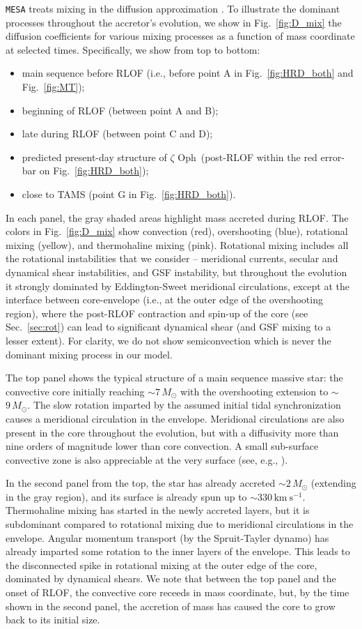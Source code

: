 \documentclass[twocolumn,twocolappendix,trackchanges]{aastex63}
\newcommand{\kms}{{\mathrm{km\ s^{-1}}}}
\DeclareRobustCommand{\Figref}[1]{Fig.~\ref{#1}}
\DeclareRobustCommand{\Secref}[1]{Sec.~\ref{#1}}
\newcommand{\zoph}{$\zeta$ Oph}
\begin{document}
\texttt{MESA} treats mixing in the diffusion approximation
\citep{paxton:11}. To illustrate the dominant processes throughout the
accretor's evolution, we show in \Figref{fig:D_mix} the diffusion
coefficients for various mixing processes as a function of mass
coordinate at selected times. Specifically, we show from top to
bottom:
\begin{itemize}
\item main sequence before RLOF (i.e., before point A in
  \Figref{fig:HRD_both} and \Figref{fig:MT});
\item beginning of RLOF (between point A and B);
\item late during RLOF (between point C and D);
\item predicted present-day structure of \zoph\ (post-RLOF within the
  red error-bar on \Figref{fig:HRD_both});
\item close to TAMS (point G in \Figref{fig:HRD_both}).
\end{itemize}
In each panel, the gray shaded areas highlight mass accreted during RLOF.
The colors in \Figref{fig:D_mix} show convection (red), overshooting
(blue), rotational mixing (yellow), and thermohaline mixing
(pink). Rotational mixing includes all the rotational instabilities
that we consider -- meridional currents, secular and dynamical shear instabilities,
and GSF instability, but throughout the evolution
it strongly dominated by Eddington-Sweet meridional circulations,
except at the interface between core-envelope (i.e., at the outer edge
of the overshooting region), where the post-RLOF contraction and
spin-up of the core (see \Secref{sec:rot}) can lead to significant
dynamical shear (and GSF mixing to a lesser extent).
For clarity, we do not show semiconvection
which is never the dominant mixing process in our model.

The top panel shows the typical structure of a main sequence massive star:
the convective core initially reaching
$\sim$$7\,M_\odot$ with the overshooting extension to $\sim$$9\,M_\odot$. The
slow rotation imparted by the assumed initial tidal synchronization
causes a meridional circulation in the envelope. Meridional
circulations are also present in the core throughout the evolution,
but with a diffusivity more than nine orders of magnitude lower than
core convection. A small sub-surface
convective zone is also appreciable at the very surface (see, e.g., \citealt{cantiello:21}).

In the second panel from the top, the star has already accreted
$\sim$$2\,M_\odot$ (extending in the gray region), and its surface is already spun up to $\sim
330\,\kms$. Thermohaline mixing has started in the newly accreted layers, but it is subdominant compared to rotational mixing due to meridional circulations in the envelope.  Angular momentum transport (by the Spruit-Tayler dynamo) has already imparted some rotation to the inner layers of the envelope. This leads to the disconnected spike in rotational mixing at the outer edge of the core, dominated by dynamical shears.  We note that between the top panel and the onset of RLOF, the convective core receeds in mass coordinate, but, by the time shown in the second panel, the accretion of mass has caused the core to grow back to its initial size.
\end{document}
